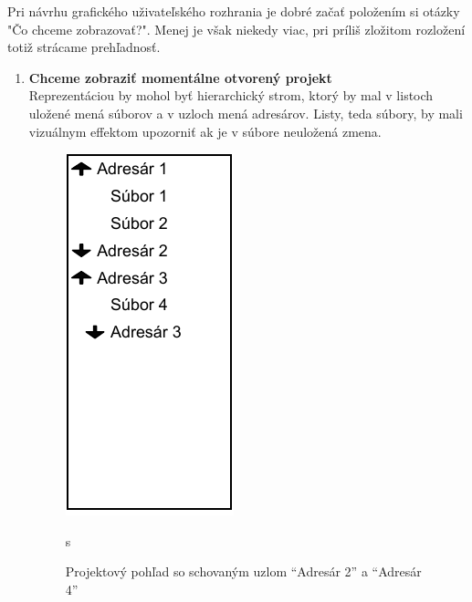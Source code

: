 Pri návrhu grafického uživateľského rozhrania je dobré začať položením si otázky "Čo chceme zobrazovať?". Menej je však niekedy viac, pri príliš zložitom rozložení totiž strácame prehľadnosť. \\

\begin{enumerate}
	\item \textbf{Chceme zobraziť momentálne otvorený projekt} \\
	Reprezentáciou by mohol byť hierarchický strom, ktorý by mal v listoch uložené mená súborov a v uzloch mená adresárov. Listy, teda súbory, by mali vizuálnym effektom upozorniť ak je v súbore neuložená zmena. \\
	
	\begin{figure}[H]
		\centering
		\begin{minipage}{.4\textwidth}
			\label{fig:fork}
			\centering
			\includegraphics[scale=0.75]{obrazky-figures/UI-project-pane}
			\caption{ Projektový pohľad so schovaným uzlom ``Adresár 2'' a ``Adresár 4''}s
		\end{minipage}
		\begin{minipage}{.05\textheight} %
			\quad
		\end{minipage}
		\begin{minipage}{.4\textwidth}
			\label{fig:join}
			\centering

\end{minipage}
\end{figure}
\end{enumerate}
